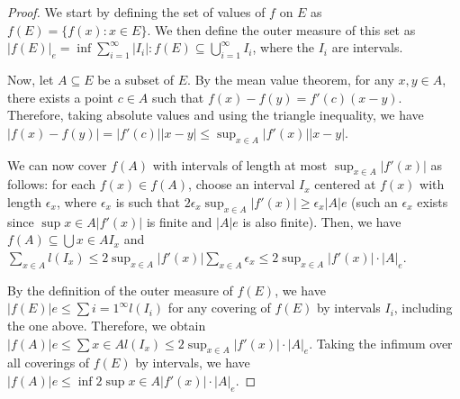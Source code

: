 \documentclass[10pt,a4paper]{article}
\theoremstyle{theorem}
\theoremstyle{definition}
\begin{document}
\begin{proof}
We start by defining the set of values of $f$ on $E$ as $f(E) = \{f(x) : x \in E\}$. We then define the outer measure of this set as $|f(E)|_e = \inf{\sum_{i=1}^\infty |I_i| : f(E) \subseteq \bigcup_{i=1}^\infty I_i}$, where the $I_i$ are intervals.

Now, let $A \subseteq E$ be a subset of $E$. By the mean value theorem, for any $x, y \in A$, there exists a point $c \in A$ such that $f(x) - f(y) = f'(c)(x - y)$. Therefore, taking absolute values and using the triangle inequality, we have $|f(x) - f(y)| = |f'(c)||x - y| \leq \sup_{x \in A} |f'(x)||x - y|$.

We can now cover $f(A)$ with intervals of length at most $\sup_{x \in A} |f'(x)|$ as follows: for each $f(x) \in f(A)$, choose an interval $I_x$ centered at $f(x)$ with length $\epsilon_x$, where $\epsilon_x$ is such that $2\epsilon_x \sup_{x \in A} |f'(x)| \geq \epsilon_x |A|e$ (such an $\epsilon_x$ exists since $\sup{x \in A} |f'(x)|$ is finite and $|A|e$ is also finite). Then, we have $f(A) \subseteq \bigcup{x \in A} I_x$ and $\sum_{x \in A} l(I_x) \leq 2\sup_{x \in A} |f'(x)|\sum_{x \in A} \epsilon_x \leq 2\sup_{x \in A} |f'(x)|\cdot |A|_e$.

By the definition of the outer measure of $f(E)$, we have $|f(E)|e \leq \sum{i=1}^\infty l(I_i)$ for any covering of $f(E)$ by intervals $I_i$, including the one above. Therefore, we obtain $|f(A)|e \leq \sum{x \in A} l(I_x) \leq 2\sup_{x \in A} |f'(x)|\cdot |A|_e$. Taking the infimum over all coverings of $f(E)$ by intervals, we have $|f(A)|e \leq \inf{2\sup{x \in A} |f'(x)|\cdot |A|_e}$.
\end{proof}
\end{document}
